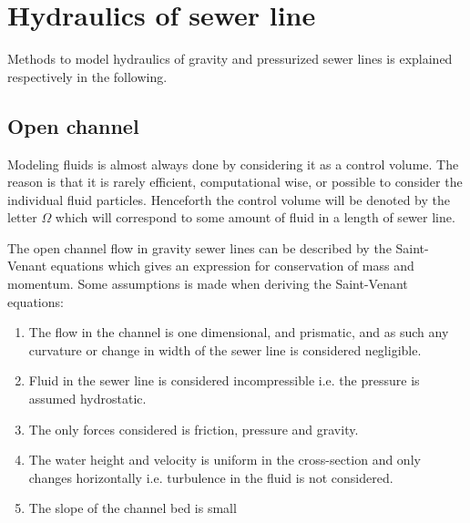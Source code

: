 \section{Hydraulics of sewer line}\label{se:hydraulics_of_sewer_line}
Methods to model hydraulics of gravity and pressurized sewer lines is explained respectively in the following. 


\subsection{Open channel}\label{subse:open_channel}
Modeling fluids is almost always done by considering it as a control volume. The reason is that it is rarely efficient, computational wise, or possible to consider the individual fluid particles.
Henceforth the control volume will be denoted by the letter $\Omega$ which will correspond to some amount of fluid in a length of sewer line.		

The open channel flow in gravity sewer lines can be described by the Saint-Venant equations which gives an expression for conservation of mass and momentum.
Some assumptions is made when deriving the Saint-Venant equations:

\begin{table}[H]
\begin{enumerate}
\item The flow in the channel is one dimensional, and prismatic, and as such any curvature or change in width of the sewer line is considered negligible.
\item Fluid in the sewer line is considered incompressible i.e. the pressure is assumed hydrostatic.
\item The only forces considered is friction, pressure and gravity.
\item The water height and velocity is uniform in the cross-section and only changes horizontally i.e. turbulence in the fluid is not considered.
\item The slope of the channel bed is small
\end{enumerate}
\label{tab:saintbernard_assumptions}
\end{table}

